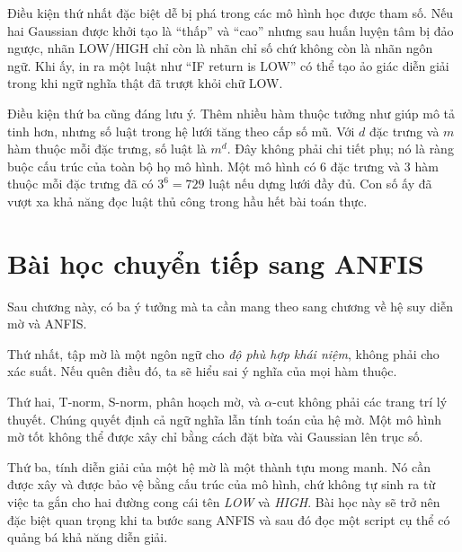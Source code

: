 Điều kiện thứ nhất đặc biệt dễ bị phá trong các mô hình học được tham số. Nếu hai Gaussian được khởi tạo là ``thấp'' và ``cao'' nhưng sau huấn luyện tâm bị đảo ngược, nhãn LOW/HIGH chỉ còn là nhãn chỉ số chứ không còn là nhãn ngôn ngữ. Khi ấy, in ra một luật như ``IF return is LOW'' có thể tạo ảo giác diễn giải trong khi ngữ nghĩa thật đã trượt khỏi chữ LOW.

Điều kiện thứ ba cũng đáng lưu ý. Thêm nhiều hàm thuộc tưởng như giúp mô tả tinh hơn, nhưng số luật trong hệ lưới tăng theo cấp số mũ. Với \(d\) đặc trưng và \(m\) hàm thuộc mỗi đặc trưng, số luật là \(m^d\). Đây không phải chi tiết phụ; nó là ràng buộc cấu trúc của toàn bộ họ mô hình. Một mô hình có 6 đặc trưng và 3 hàm thuộc mỗi đặc trưng đã có \(3^6=729\) luật nếu dựng lưới đầy đủ. Con số ấy đã vượt xa khả năng đọc luật thủ công trong hầu hết bài toán thực.

\section{Bài học chuyển tiếp sang ANFIS}

Sau chương này, có ba ý tưởng mà ta cần mang theo sang chương về hệ suy diễn mờ và ANFIS.

Thứ nhất, tập mờ là một ngôn ngữ cho \emph{độ phù hợp khái niệm}, không phải cho xác suất. Nếu quên điều đó, ta sẽ hiểu sai ý nghĩa của mọi hàm thuộc.

Thứ hai, T-norm, S-norm, phân hoạch mờ, và \(\alpha\)-cut không phải các trang trí lý thuyết. Chúng quyết định cả ngữ nghĩa lẫn tính toán của hệ mờ. Một mô hình mờ tốt không thể được xây chỉ bằng cách đặt bừa vài Gaussian lên trục số.

Thứ ba, tính diễn giải của một hệ mờ là một thành tựu mong manh. Nó cần được xây và được bảo vệ bằng cấu trúc của mô hình, chứ không tự sinh ra từ việc ta gắn cho hai đường cong cái tên \emph{LOW} và \emph{HIGH}. Bài học này sẽ trở nên đặc biệt quan trọng khi ta bước sang ANFIS và sau đó đọc một script cụ thể có quảng bá khả năng diễn giải.
